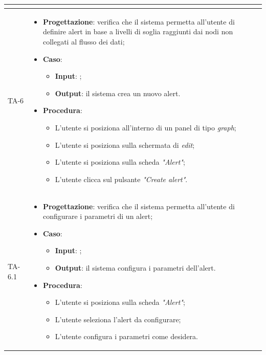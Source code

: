 \begin{longtable}{|C{2.5cm}|C{13cm}|}
\begin{itemize}
\begin{itemize}
	\end{itemize} 
\end{itemize} \\
\hline
{TA-6} &
\begin{itemize}
	\item \textbf{Progettazione}: verifica che il sistema permetta all'utente di definire alert in base a livelli di soglia raggiunti dai nodi non collegati al flusso dei dati;
	\item \textbf{Caso}: 
	\begin{itemize}
		\item \textbf{Input}: ;
		\item \textbf{Output}: il sistema crea un nuovo alert.
	\end{itemize}
	\item \textbf{Procedura}:
	\begin{itemize}
		\item L'utente si posiziona all'interno di un panel di tipo \emph{graph};
		\item L'utente si posiziona sulla schermata di \emph{edit};
		\item L'utente si posiziona sulla scheda \emph{"Alert"};
		\item L'utente clicca sul pulsante \emph{"Create alert"}.
	\end{itemize} 
\end{itemize} \\
\hline
{TA-6.1} &
\begin{itemize}
	\item \textbf{Progettazione}: verifica che il sistema permetta all'utente di configurare i parametri di un alert;
	\item \textbf{Caso}: 
	\begin{itemize}
		\item \textbf{Input}: ;
		\item \textbf{Output}: il sistema configura i parametri dell'alert.
	\end{itemize}
	\item \textbf{Procedura}:
	\begin{itemize}
		\item L'utente si posiziona sulla scheda \emph{"Alert"};
		\item L'utente seleziona l'alert da configurare;
		\item L'utente configura i parametri come desidera.
	\end{itemize} 
\end{itemize} \\

\end{longtable}
